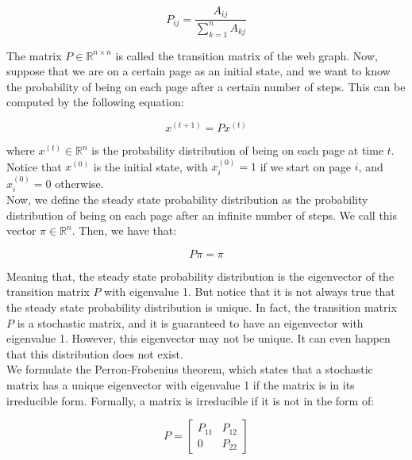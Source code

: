 \begin{equation}
    P_{ij} = \frac{A_{ij}}{\sum_{k=1}^n A_{kj}}
\end{equation}

The matrix $P \in \mathbb{R}^{n \times n}$ is called the transition matrix of the web graph. Now, suppose that
we are on a certain page as an initial state, and we want to know the probability of being on each page after
a certain number of steps. This can be computed by the following equation:

\begin{equation}
    x^{(t+1)} = P x^{(t)}
\end{equation}

where $x^{(t)} \in \mathbb{R}^n$ is the probability distribution of being on each page at time $t$. Notice that
$x^{(0)}$ is the initial state, with $x^{(0)}_i = 1$ if we start on page $i$, and $x^{(0)}_i = 0$ otherwise.\\

Now, we define the steady state probability distribution as the probability distribution of being on each page
after an infinite number of steps. We call this vector $\pi \in \mathbb{R}^n$. Then, we have that:

\begin{equation}
    P \pi = \pi
\end{equation}

Meaning that, the steady state probability distribution is the eigenvector of the transition matrix $P$ with
eigenvalue 1. But notice that it is not always true that the steady state probability distribution is unique.
In fact, the transition matrix $P$ is a stochastic matrix, and it is guaranteed to have an eigenvector with
eigenvalue 1. However, this eigenvector may not be unique. It can even happen that this distribution does 
not exist.\\

We formulate the Perron-Frobenius theorem, which states that a stochastic matrix has a unique eigenvector
with eigenvalue 1 if the matrix is in its irreducible form. Formally, a matrix is irreducible if it is not
in the form of:

\begin{equation}
    P = \begin{bmatrix}
        P_{11} & P_{12} \\
        0 & P_{22}
    \end{bmatrix}
\end{equation}

